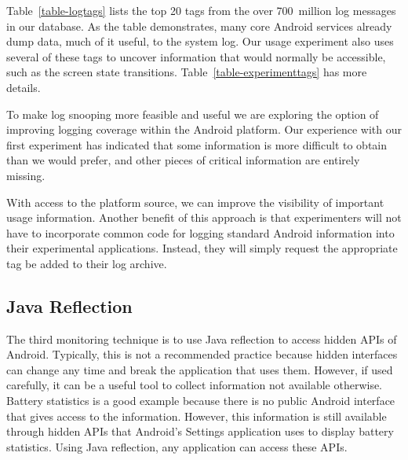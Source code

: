 Table~\ref{table-logtags} lists the top 20 tags from the over 700~million log
messages in our database. As the table demonstrates, many core Android
services already dump data, much of it useful, to the system log. Our usage
experiment also uses several of these tags to uncover information that would
normally be accessible, such as the screen state transitions.
Table~\ref{table-experimenttags} has more details.

To make log snooping more feasible and useful we are exploring the option of
improving logging coverage within the Android platform. Our experience with
our first experiment has indicated that some information is more difficult to
obtain than we would prefer, and other pieces of critical information are
entirely missing. %

With access to the platform source, we can improve the visibility of
important usage information. Another benefit of this approach is that
experimenters will not have to incorporate common code for logging standard
Android information into their experimental applications. Instead, they will
simply request the appropriate tag be added to their log archive.

\subsection{Java Reflection}

The third monitoring technique is to use Java reflection to access hidden APIs
of Android. Typically, this is not a recommended practice because hidden interfaces
can change any time and break the application that uses them. However, if used
carefully, it can be a useful tool to collect information not available
otherwise. Battery statistics is a good example because there is no public
Android interface that gives access to the information. However, this information is
still available through hidden APIs that Android's Settings application uses to
display battery statistics. Using Java reflection, any application can access
these APIs. %
